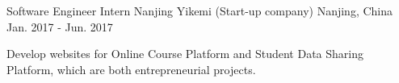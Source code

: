 \begin{cventries}
  \cventry
    {Software Engineer Intern} %
    {Nanjing Yikemi (Start-up company)} %
    {Nanjing, China} %
    {Jan. 2017 - Jun. 2017} %
    {
      \begin{cvitems} %
        \item {Develop websites for Online Course Platform and Student Data Sharing Platform, which are both entrepreneurial projects.}
      \end{cvitems}
    }
\end{cventries}
